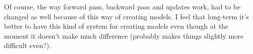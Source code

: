 \documentclass{article}
\begin{document}
Of course, the way forward pass, backward pass and updates work, had to be changed as well because of this 
way of creating models. I feel that long-term it's better to have this kind of system for creating models even 
though at the moment it doesn't make much difference (probably makes things slightly more difficult even?).
\end{document}

